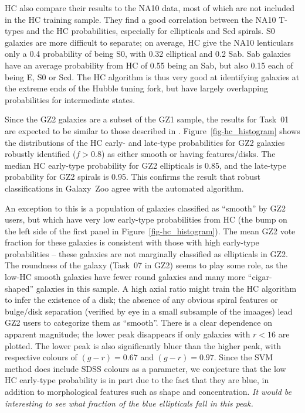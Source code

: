 \documentclass[useAMS,usenatbib]{mn2e}
\begin{document}
HC also compare their results to the NA10 data, most of which are not included in the HC training sample. They find a good correlation between the NA10 T-types and the HC probabilities, especially for ellipticals and Scd spirals. S0 galaxies are more difficult to separate; on average, HC give the NA10 lenticulars only a 0.4 probability of being S0, with 0.32 elliptical and 0.2 Sab. Sab galaxies have an average probability from HC of 0.55 being an Sab, but also 0.15 each of being E, S0 or Scd. The HC algorithm is thus very good at identifying galaxies at the extreme ends of the Hubble tuning fork, but have largely overlapping probabilities for intermediate states. 

Since the GZ2 galaxies are a subset of the GZ1 sample, the results for Task~01 are expected to be similar to those described in \citet{hue11}. Figure~\ref{fig-hc_histogram} shows the distributions of the HC early- and late-type probabilities for GZ2 galaxies robustly identified ($f>0.8$) as either smooth or having features/disks. The median HC early-type probability for GZ2 ellipticals is 0.85, and the late-type probability for GZ2 spirals is 0.95. This confirms the result that robust classifications in Galaxy~Zoo agree with the automated algorithm. 

An exception to this is a population of galaxies classified as ``smooth'' by GZ2 users, but which have very low early-type probabilities from HC (the bump on the left side of the first panel in Figure~\ref{fig-hc_histogram}). The mean GZ2 vote fraction for these galaxies is consistent with those with high early-type probabilities -- these galaxies are not marginally classified as ellipticals in GZ2. The roundness of the galaxy (Task~07 in GZ2) seems to play some role, as the low-HC smooth galaxies have fewer round galaxies and many more ``cigar-shaped'' galaxies in this sample. A high axial ratio might train the HC algorithm to infer the existence of a disk; the absence of any obvious spiral features or bulge/disk separation (verified by eye in a small subsample of the imaages) lead GZ2 users to categorize them as ``smooth''. There is a clear dependence on apparent magnitude; the lower peak disappears if only galaxies with $r<16$ are plotted. The lower peak is also significantly bluer than the higher peak, with respective colours of $(g-r)=0.67$ and $(g-r)=0.97$. Since the SVM method does include SDSS colours as a parameter, we conjecture that the low HC early-type probability is in part due to the fact that they are blue, in addition to morphological features such as shape and concentration. {\em It would be interesting to see what fraction of the blue ellipticals \citep{sch09} fall in this peak.}
\end{document}

